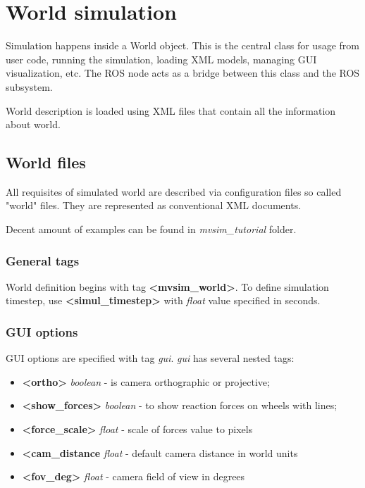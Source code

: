 \documentclass[a4paper,11pt]{article}
\begin{document}
\newpage

\section{World simulation}
Simulation happens inside a World object.
This is the central class for usage from user code, running the simulation, loading XML models, managing GUI visualization, etc.
The ROS node acts as a bridge between this class and the ROS subsystem.

World description is loaded using XML files that contain all the information about world.

\subsection{World files}

All requisites of simulated world are described via configuration files so called "world" files. They are represented as conventional XML documents.

Decent amount of examples can be found in \textit{mvsim\_tutorial} folder.

\subsubsection{General tags}
World definition begins with tag \textbf{\textless mvsim\_world\textgreater}. To define simulation timestep, use \textbf{\textless simul\_timestep\textgreater} with \textit{float} value specified in seconds.

\subsubsection{GUI options}
GUI options are specified with tag \textit{gui}. \textit{gui} has several nested tags:

\begin{itemize}
	\item \textbf{\textless ortho\textgreater } \textit{boolean} - is camera orthographic or projective;
	\item \textbf{\textless show\_forces\textgreater } \textit{boolean} - to show reaction forces on wheels with lines;
	\item \textbf{\textless force\_scale\textgreater } \textit{float} - scale of forces value to pixels
	\item \textbf{\textless cam\_distance} \textit{float} - default camera distance in world units
	\item \textbf{\textless fov\_deg\textgreater } \textit{float} - camera field of view in degrees
\end{itemize}
\end{document}
